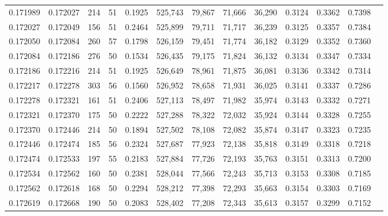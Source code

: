 \begin{tabular}{rrrrrrrrrrrrr}
0.171989 & 0.172027 &   214 &  51 &                                     0.1925 & 525,743 &  79,867 &  71,666 &  36,290 & 0.3124 & 0.3362 & 0.7398 \\
0.172027 & 0.172049 &   156 &  51 &                                     0.2464 & 525,899 &  79,711 &  71,717 &  36,239 & 0.3125 & 0.3357 & 0.7384 \\
0.172050 & 0.172084 &   260 &  57 &                                     0.1798 & 526,159 &  79,451 &  71,774 &  36,182 & 0.3129 & 0.3352 & 0.7360 \\
0.172084 & 0.172186 &   276 &  50 &                                     0.1534 & 526,435 &  79,175 &  71,824 &  36,132 & 0.3134 & 0.3347 & 0.7334 \\
0.172186 & 0.172216 &   214 &  51 &                                     0.1925 & 526,649 &  78,961 &  71,875 &  36,081 & 0.3136 & 0.3342 & 0.7314 \\
0.172217 & 0.172278 &   303 &  56 &                                     0.1560 & 526,952 &  78,658 &  71,931 &  36,025 & 0.3141 & 0.3337 & 0.7286 \\
0.172278 & 0.172321 &   161 &  51 &                                     0.2406 & 527,113 &  78,497 &  71,982 &  35,974 & 0.3143 & 0.3332 & 0.7271 \\
0.172321 & 0.172370 &   175 &  50 &                                     0.2222 & 527,288 &  78,322 &  72,032 &  35,924 & 0.3144 & 0.3328 & 0.7255 \\
0.172370 & 0.172446 &   214 &  50 &                                     0.1894 & 527,502 &  78,108 &  72,082 &  35,874 & 0.3147 & 0.3323 & 0.7235 \\
0.172446 & 0.172474 &   185 &  56 &                                     0.2324 & 527,687 &  77,923 &  72,138 &  35,818 & 0.3149 & 0.3318 & 0.7218 \\
0.172474 & 0.172533 &   197 &  55 &                                     0.2183 & 527,884 &  77,726 &  72,193 &  35,763 & 0.3151 & 0.3313 & 0.7200 \\
0.172534 & 0.172562 &   160 &  50 &                                     0.2381 & 528,044 &  77,566 &  72,243 &  35,713 & 0.3153 & 0.3308 & 0.7185 \\
0.172562 & 0.172618 &   168 &  50 &                                     0.2294 & 528,212 &  77,398 &  72,293 &  35,663 & 0.3154 & 0.3303 & 0.7169 \\
0.172619 & 0.172668 &   190 &  50 &                                     0.2083 & 528,402 &  77,208 &  72,343 &  35,613 & 0.3157 & 0.3299 & 0.7152 \\

\end{tabular}
